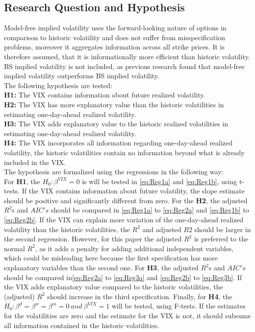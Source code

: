 \subsection{Research Question and Hypothesis}\label{sec:41aHypothesis}
Model-free implied volatility uses the forward-looking nature of options in comparison to historic volatility and does not suffer from misspecification problems, moreover it aggregates information across all strike prices. It is therefore assumed, that it is informationally more efficient than historic volatility. \ac{BS} implied volatility is not included, as previous research found that model-free implied volatility outperforms \ac{BS} implied volatility.\\
The following hypothesis are tested:\\
\textbf{\ac{H1}:} The \ac{VIX} contains information about future realized volatility.\\
\textbf{\ac{H2}:} The \ac{VIX} has more explanatory value than the historic volatilities in estimating one-day-ahead realized volatility.\\
\textbf{\ac{H3}:} The \ac{VIX} adds explanatory value to the historic realized volatilities in estimating one-day-ahead realized volatility.\\
\textbf{\ac{H4}:} The \ac{VIX} incorporates all information regarding one-day-ahead realized volatility, the historic volatilities contain no information beyond what is already included in the \ac{VIX}.\\
The hypothesis are formalized using the regressions in the following way:\\
For \textbf{\ac{H1}}, the $H_{0}: \beta^{VIX} = 0$ is will be tested in \ref{eq:Reg1a} and \ref{eq:Reg1b}, using t-tests. If the \ac{VIX} contains information about future volatility, the slope estimate should be positive and significantly different from zero. For the \textbf{\ac{H2}}, the adjusted $R^{2}$s and $AIC's$ should be compared in \ref{eq:Reg1a} to \ref{eq:Reg2a} and \ref{eq:Reg1b} to \ref{eq:Reg2b}. If the \ac{VIX} can explain more variation of the one-day-ahead realized volatility than the historic volatilities, the $R^{2}$ and adjusted $R{2}$ should be larger in the second regression. However, for this paper the adjusted $R^{2}$ is preferred to the normal $R^{2}$, as it adds a penalty for adding additional independent variables, which could be misleading here because the first specification has more explanatory variables than the second one. For \textbf{\ac{H3}}, the adjusted $R^{2}$s and $AIC's$ should be compared in\ref{eq:Reg2a} to \ref{eq:Reg3a} and \ref{eq:Reg2b} to \ref{eq:Reg3b}. If the \ac{VIX} adds explanatory value compared to the historic volatilities, the (adjusted) $R^{2}$ should increase in the third specification. Finally, for \textbf{\ac{H4}}, the $H_{0}: \beta^{d} = \beta^{w} = \beta^{m} = 0 \ and \ \beta^{VIX} = 1$ will be tested, using F-tests. If the estimates for the volatilities are zero and the estimate for the \ac{VIX} is not, it should subsume all information contained in the historic volatilities.

